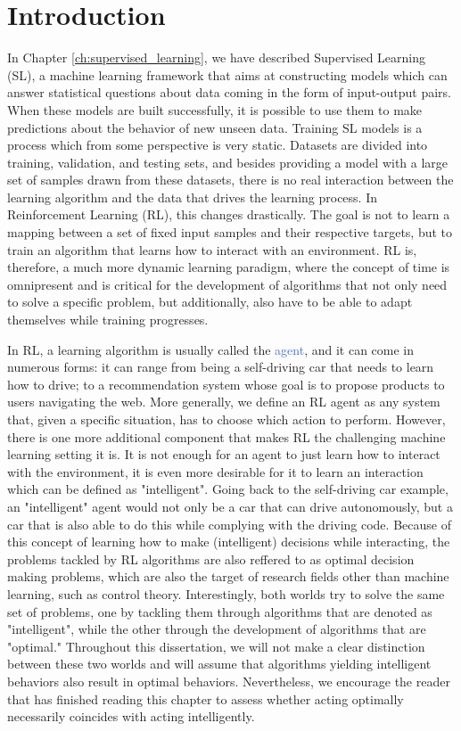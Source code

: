 \section{Introduction}
\label{sec:rl_introduction}
In Chapter \ref{ch:supervised_learning}, we have described Supervised Learning (SL), a machine learning framework that aims at constructing models which can answer statistical questions about data coming in the form of input-output pairs. When these models are built successfully, it is possible to use them to make predictions about the behavior of new unseen data. Training SL models is a process which from some perspective is very static. Datasets are divided into training, validation, and testing sets, and besides providing a model with a large set of samples drawn from these datasets, there is no real interaction between the learning algorithm and the data that drives the learning process. In Reinforcement Learning (RL), this changes drastically. The goal is not to learn a mapping between a set of fixed input samples and their respective targets, but to train an algorithm that learns how to interact with an environment. RL is, therefore, a much more dynamic learning paradigm, where the concept of time is omnipresent and is critical for the development of algorithms that not only need to solve a specific problem, but additionally, also have to be able to adapt themselves while training progresses.

In RL, a learning algorithm is usually called the \textcolor{RoyalBlue}{agent}, and it can come in numerous forms: it can range from being a self-driving car that needs to learn how to drive; to a recommendation system whose goal is to propose products to users navigating the web. More generally, we define an RL agent as any system that, given a specific situation, has to choose which action to perform. However, there is one more additional component that makes RL the challenging machine learning setting it is.
It is not enough for an agent to just learn how to interact with the environment, it is even more desirable for it to learn an interaction which can be defined as "intelligent". Going back to the self-driving car example, an "intelligent" agent would not only be a car that can drive autonomously, but a car that is also able to do this while complying with the driving code. Because of this concept of learning how to make (intelligent) decisions while interacting, the problems tackled by RL algorithms are also reffered to as optimal decision making problems, which are also the target of research fields other than machine learning, such as control theory. Interestingly, both worlds try to solve the same set of problems, one by tackling them through algorithms that are denoted as "intelligent", while the other through the development of algorithms that are "optimal." Throughout this dissertation, we will not make a clear distinction between these two worlds and will assume that algorithms yielding intelligent behaviors also result in optimal behaviors. Nevertheless, we encourage the reader that has finished reading this chapter to assess whether acting optimally necessarily coincides with acting intelligently.

